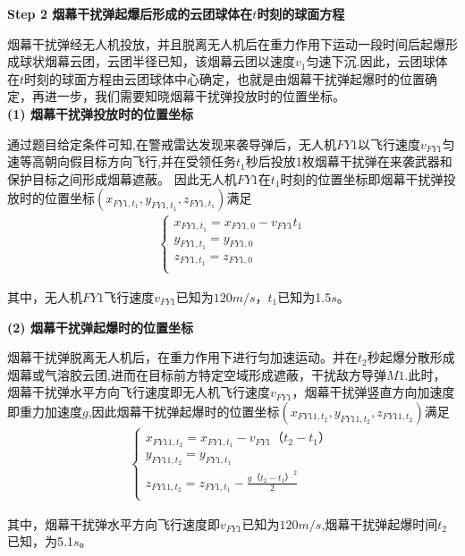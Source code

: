\documentclass[../main.tex]{subfiles}
\begin{document}
\noindent\textbf{Step 2 烟幕干扰弹起爆后形成的云团球体在$t$时刻的球面方程}
\par 烟幕干扰弹经无人机投放，并且脱离无人机后在重力作用下运动一段时间后起爆形成球状烟幕云团，云团半径已知，该烟幕云团以速度$v_1$匀速下沉.因此，云团球体在$t$时刻的球面方程由云团球体中心确定，也就是由烟幕干扰弹起爆时的位置确定，再进一步，我们需要知晓烟幕干扰弹投放时的位置坐标。
\\
\noindent \textbf{(1) 烟幕干扰弹投放时的位置坐标}
\par 通过题目给定条件可知,在警戒雷达发现来袭导弹后，无人机\( FY1 \)以飞行速度\( v_{FY1} \)匀速等高朝向假目标方向飞行,并在受领任务$t_1$秒后投放1枚烟幕干扰弹在来袭武器和保护目标之间形成烟幕遮蔽。
因此无人机$FY1$在$t_1$时刻的位置坐标即烟幕干扰弹投放时的位置坐标$(x_{FY1,t_1}, y_{FY1,{t_1}}, z_{FY1,{t_1}})$满足
\begin{align}\label{1.8}
\left\{ \begin{array}{l}
x_{FY1,{t_1}}=x_{FY1,0}-v_{FY1}{t_1}\\
y_{FY1,{t_1}}=y_{FY1,0}\\
z_{FY1,{t_1}}=z_{FY1,0}\\
\end{array} \right. 
\end{align}
\par 其中，无人机$FY1$飞行速度\( v_{FY1} \)已知为$120m/s$，$t_1$已知为1.5$s$。


\noindent\textbf{(2) 烟幕干扰弹起爆时的位置坐标}
\par 烟幕干扰弹脱离无人机后，在重力作用下进行匀加速运动。并在$t_2$秒起爆分散形成烟幕或气溶胶云团,进而在目标前方特定空域形成遮蔽，干扰敌方导弹$M1$.此时，烟幕干扰弹水平方向飞行速度即无人机飞行速度\( v_{FY1} \)，烟幕干扰弹竖直方向加速度即重力加速度$g$,因此烟幕干扰弹起爆时的位置坐标$\left( x_{FY11,t_2},y_{FY11,t_2},z_{FY11,t_2} \right)$满足
\begin{align}\label{1.9}
\left\{ \begin{array}{l}
	x_{FY11,{t_2}}=x_{FY1,t_1}-v_{FY1}\text{（}t_2-t_1\text{）}\\
	y_{FY11,{t_2}}=y_{FY1,t_1}\\
	z_{FY11,{t_2}}=z_{FY1,t_1}-\frac{g\text{（}t_2-t_1\text{）}^2}{2}\\
\end{array} \right. 
\end{align}
\par 其中，烟幕干扰弹水平方向飞行速度即\( v_{FY1} \)已知为$120m/s$,烟幕干扰弹起爆时间$t_2$已知，为5.1$s$。
\end{document}
